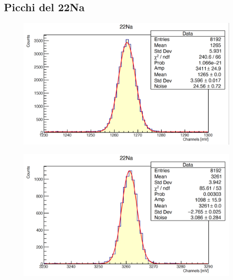 \documentclass[a4paper,10pt]{article}
\begin{document}
\subsection{Picchi del 22Na}
\begin{figure}[H]
    \centering
    \includegraphics[scale=0.45]{appendice/Na}
\end{figure}
\begin{figure}[H]
    \centering
    \includegraphics[scale=0.45]{appendice/Na2}
\end{figure}

\end{document}
